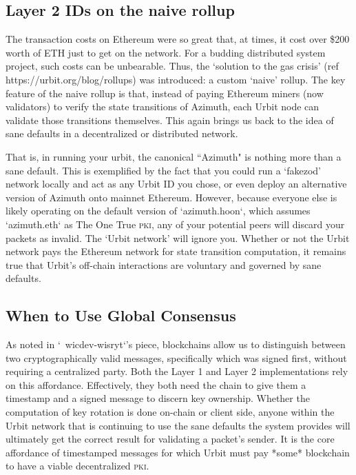 \documentclass[twoside]{article}
\begin{document}
\subsection{Layer 2 IDs on the naive rollup}

The transaction costs on Ethereum were so great that, at times, it cost over \$200 worth of ETH just to get on the network. For a budding distributed system project, such costs can be unbearable. Thus, the `solution to the gas crisis' (ref https://urbit.org/blog/rollups) was introduced: a custom `naive' rollup. The key feature of the naive rollup is that, instead of paying Ethereum miners (now validators) to verify the state transitions of Azimuth, each Urbit node can validate those transitions themselves. This again brings us back to the idea of sane defaults in a decentralized or distributed network. 

That is, in running your urbit, the canonical ``Azimuth" is nothing more than a sane default. This is exemplified by the fact that you could run a `fakezod' network locally and act as any Urbit ID you chose, or even deploy an alternative version of Azimuth onto mainnet Ethereum. However, because everyone else is likely operating on the default version of `azimuth.hoon`, which assumes `azimuth.eth` as The One True \textsc{pki}, any of your potential peers will discard your packets as invalid. The `Urbit network' will ignore you. Whether or not the Urbit network pays the Ethereum network for state transition computation, it remains true that Urbit's off-chain interactions are voluntary and governed by sane defaults.

\subsection{When to Use Global Consensus}

As noted in `~wicdev-wisryt`'s piece, blockchains allow us to distinguish between two cryptographically valid messages, specifically which was signed first, without requiring a centralized party. Both the Layer 1 and Layer 2 implementations rely on this affordance. Effectively, they both need the chain to give them a timestamp and a signed message to discern key ownership. Whether the computation of key rotation is done on-chain or client side, anyone within the Urbit network that is continuing to use the sane defaults the system provides will ultimately get the correct result for validating a packet's sender. It is the core affordance of timestamped messages for which Urbit must pay *some* blockchain to have a viable decentralized \textsc{pki}.
\end{document}
